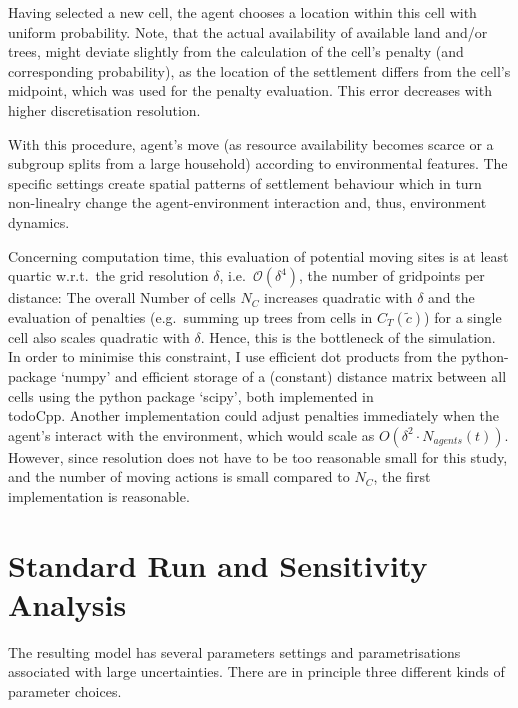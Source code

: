 Having selected a new cell, the agent chooses a location within this cell with uniform probability.
Note, that the actual availability of available land and/or trees, might deviate slightly from the calculation of the cell's penalty (and corresponding probability), as the location of the settlement differs from the cell's midpoint, which was used for the penalty evaluation.
This error decreases with higher discretisation resolution.



With this procedure, agent's move (as resource availability becomes scarce or a subgroup splits from a large household) according to environmental features. 
The specific settings create spatial patterns of settlement behaviour which in turn non-linealry change the agent-environment interaction and, thus, environment dynamics.

Concerning computation time, this evaluation of potential moving sites is at least quartic w.r.t.\ the grid resolution $\delta$, i.e.\ $\mathcal{O}(\delta^4)$, the number of gridpoints per distance: The overall Number of cells $N_C$ increases quadratic with $\delta$ and the evaluation of penalties (e.g.\ summing up trees from cells in $C_T(\tilde{c})$) for a single cell also scales quadratic with $\delta$. 
Hence, this is the bottleneck of the simulation. 
In order to minimise this constraint, I use efficient dot products from the python-package `numpy' and efficient storage of a (constant) distance matrix between all cells using the python package `scipy', both implemented in \\todo{Cpp}.
Another implementation could adjust penalties immediately when the agent's interact with the environment, which would scale as $O(\delta^2\cdot N_{agents}(t))$.
However, since resolution does not have to be too reasonable small for this study, and the number of moving actions is small compared to $N_C$, the first implementation is reasonable.
	
		
		
\section{Standard Run and Sensitivity Analysis}
The resulting model has several parameters settings and parametrisations associated with large uncertainties. 
There are in principle three different kinds of parameter choices.

